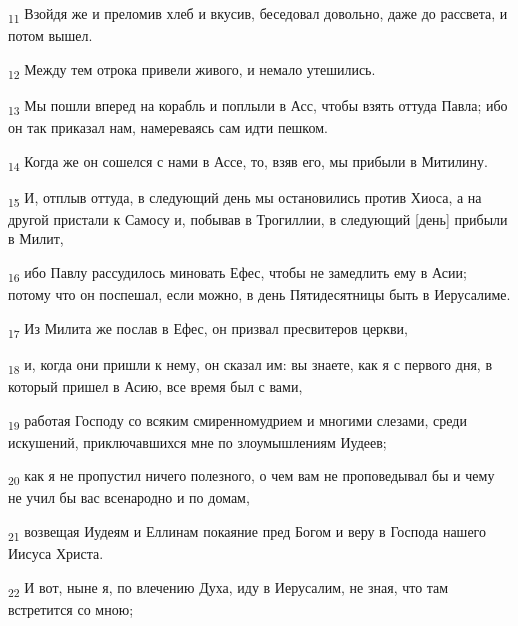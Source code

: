 \begin{tcolorbox}
\textsubscript{11} Взойдя же и преломив хлеб и вкусив, беседовал довольно, даже до рассвета, и потом вышел.
\end{tcolorbox}
\begin{tcolorbox}
\textsubscript{12} Между тем отрока привели живого, и немало утешились.
\end{tcolorbox}
\begin{tcolorbox}
\textsubscript{13} Мы пошли вперед на корабль и поплыли в Асс, чтобы взять оттуда Павла; ибо он так приказал нам, намереваясь сам идти пешком.
\end{tcolorbox}
\begin{tcolorbox}
\textsubscript{14} Когда же он сошелся с нами в Ассе, то, взяв его, мы прибыли в Митилину.
\end{tcolorbox}
\begin{tcolorbox}
\textsubscript{15} И, отплыв оттуда, в следующий день мы остановились против Хиоса, а на другой пристали к Самосу и, побывав в Трогиллии, в следующий [день] прибыли в Милит,
\end{tcolorbox}
\begin{tcolorbox}
\textsubscript{16} ибо Павлу рассудилось миновать Ефес, чтобы не замедлить ему в Асии; потому что он поспешал, если можно, в день Пятидесятницы быть в Иерусалиме.
\end{tcolorbox}
\begin{tcolorbox}
\textsubscript{17} Из Милита же послав в Ефес, он призвал пресвитеров церкви,
\end{tcolorbox}
\begin{tcolorbox}
\textsubscript{18} и, когда они пришли к нему, он сказал им: вы знаете, как я с первого дня, в который пришел в Асию, все время был с вами,
\end{tcolorbox}
\begin{tcolorbox}
\textsubscript{19} работая Господу со всяким смиренномудрием и многими слезами, среди искушений, приключавшихся мне по злоумышлениям Иудеев;
\end{tcolorbox}
\begin{tcolorbox}
\textsubscript{20} как я не пропустил ничего полезного, о чем вам не проповедывал бы и чему не учил бы вас всенародно и по домам,
\end{tcolorbox}
\begin{tcolorbox}
\textsubscript{21} возвещая Иудеям и Еллинам покаяние пред Богом и веру в Господа нашего Иисуса Христа.
\end{tcolorbox}
\begin{tcolorbox}
\textsubscript{22} И вот, ныне я, по влечению Духа, иду в Иерусалим, не зная, что там встретится со мною;
\end{tcolorbox}
